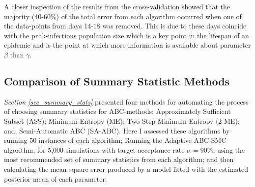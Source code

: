 \documentclass[11pt,a4paper]{article}
\theoremstyle{break}
\begin{document}
  \par A closer inspection of the results from the cross-validation showed that the majority (40-60\%) of the total error from each algorithm occurred when one of the data-points from days 14-18 was removed. This is due to these days coincide with the peak-infectious population size which is a key point in the lifespan of an epidemic and is the point at which more information is available about parameter $\beta$ than $\gamma$.

\subsection{Comparison of Summary Statistic Methods}\label{sec_comparison_of_ss_methods}

  \par \textit{Section \ref{sec_summary_stats}} presented four methods for automating the process of choosing summary statistics for ABC-methods: Approximately Sufficient Subset (ASS); Minimum Entropy (ME); Two-Step Minimum Entropy (2-ME); and, Semi-Automatic ABC (SA-ABC). Here I assessed these algorithms by running 50 instances of each algorithm; Running the Adaptive ABC-SMC algorithm, for 5,000 simulations with target acceptance rate $\alpha=90\%$, using the most recommended set of summary statistics from each algorithm; and then calculating the mean-square error produced by a model fitted with the estimated posterior mean of each parameter.
\end{document}

